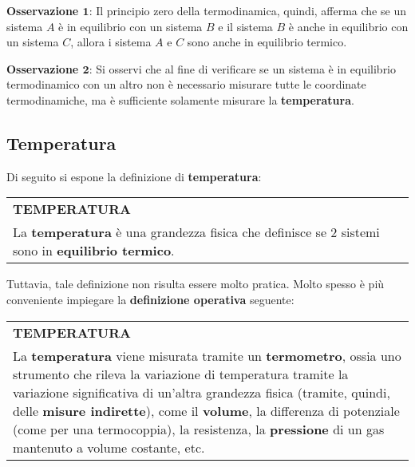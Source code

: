 \documentclass[a4paper]{extarticle}
\renewcommand\arraystretch{}
\begin{document}
\vspace{1em}
\noindent
\textbf{Osservazione $\boldsymbol{1}$}: Il principio zero della termodinamica, quindi, afferma che se un sistema $A$ è in equilibrio con un sistema $B$ e il sistema $B$ è anche in equilibrio con un sistema $C$, allora i sistema $A$ e $C$ sono anche in equilibrio termico.

\vspace{1em}
\noindent
\textbf{Osservazione $\boldsymbol{2}$}: Si osservi che al fine di verificare se un sistema è in equilibrio termodinamico con un altro non è necessario misurare tutte le coordinate termodinamiche, ma è sufficiente solamente misurare la \textbf{temperatura}.

\vspace{1em}
\subsection{Temperatura}
Di seguito si espone la definizione di \textbf{temperatura}:

\vspace{1em}
\setlength{\tabcolsep}{14pt}
\renewcommand{\arraystretch}{2}
\noindent
\begin{tabularx}{\textwidth}{@{}|P|@{}}
    \hline
    {\textbf{TEMPERATURA}}\\
    \parbox{\linewidth}{La \textbf{temperatura} è una grandezza fisica che definisce se $2$ sistemi sono in \textbf{equilibrio termico}.\vspace{3mm}}\\
    \hline
\end{tabularx}

\vspace{2em}
\noindent
Tuttavia, tale definizione non risulta essere molto pratica. Molto spesso è più conveniente impiegare la \textbf{definizione operativa} seguente:

\vspace{1em}
\setlength{\tabcolsep}{14pt}
\renewcommand{\arraystretch}{2}
\noindent
\begin{tabularx}{\textwidth}{@{}|P|@{}}
    \hline
    {\textbf{TEMPERATURA}}\\
    \parbox{\linewidth}{La \textbf{temperatura} viene misurata tramite un \textbf{termometro}, ossia uno strumento che rileva la variazione di temperatura tramite la variazione significativa di un'altra grandezza fisica (tramite, quindi, delle \textbf{misure indirette}), come il \textbf{volume}, la differenza di potenziale (come per una termocoppia), la resistenza, la \textbf{pressione} di un gas mantenuto a volume costante, etc.\vspace{3mm}}\\
    \hline
\end{tabularx}
\end{document}
